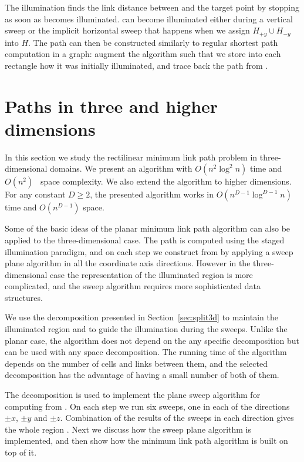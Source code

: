 \documentclass[english,gradu]{tktltiki2018}
\begin{document}
The illumination finds the link distance between \spt and the target point \ept by stopping as soon as \ept becomes illuminated.
\epts can become illuminated either during a vertical sweep or the implicit horizontal sweep that happens when we assign $H_{+y}\cup H_{-y}$ into $H$.
The path can then be constructed similarly to regular shortest path computation in a graph:
augment the algorithm such that we store into each rectangle how it was initially illuminated, and trace back the path from \ept.



\section{Paths in three and higher dimensions}\label{sec:minlink3d}

In this section we study the rectilinear minimum link path problem in three-dimensional domains.
We present an algorithm with $O(n^2\log^2 n)$ time and $O(n^2)$~\cite{restricted} space complexity.
We also extend the algorithm to higher dimensions.
For any constant $D\ge 2$, the presented algorithm works in $O(n^{D-1}\log^{D-1}n)$ time and $O(n^{D-1})$ space.

Some of the basic ideas of the planar minimum link path algorithm can also be applied to the three-dimensional case.
The path is computed using the staged illumination paradigm, and on each step we construct  from  by applying a sweep plane algorithm in all the coordinate axis directions.
However in the three-dimensional case the representation of the illuminated region is more complicated, and the sweep algorithm requires more sophisticated data structures.

We use the decomposition presented in Section~\ref{sec:split3d} to maintain the illuminated region and to guide the illumination during the sweeps.
Unlike the planar case, the algorithm does not depend on the any specific decomposition but can be used with any space decomposition.
The running time of the algorithm depends on the number of cells and links between them, and the selected decomposition has the advantage of having a small number of both of them.

The decomposition is used to implement the plane sweep algorithm for computing  from .
On each step we run six sweeps, one in each of the directions $\pm x$, $\pm y$ and $\pm z$.
Combination of the results of the sweeps in each direction gives the whole region .
Next we discuss how the sweep plane algorithm is implemented, and then show how the minimum link path algorithm is built on top of it.
\end{document}
